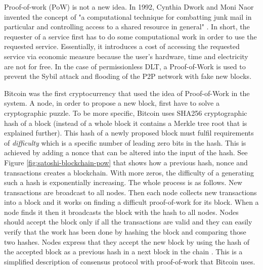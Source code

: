 Proof-of-work (PoW) is not a new idea. In 1992, Cynthia Dwork and Moni Naor invented the concept of "a computational technique for combatting junk mail in particular and controlling access to a shared resource in general" \cite{dwork_pricing_1992}.
In short, the requester of a service first has to do some computational work in order to use the requested service. Essentially, it introduces a cost of accessing the requested service via economic measure because the user's hardware, time and electricity are not for free. In the case of permissionless DLT, a Proof-of-Work is used to prevent the Sybil attack and flooding of the P2P network with fake new blocks. 

Bitcoin was the first cryptocurrency that used the idea of Proof-of-Work in the system. A node, in order to propose a new block, first have to solve a cryptographic puzzle. To be more specific, Bitcoin uses SHA256 cryptographic hash of a block (instead of a whole block it contains a Merkle tree root that is explained further). This hash of a newly proposed block must fulfil requirements of \textit{difficulty} which is a specific number of leading zero bits in the hash. This is achieved by adding a nonce that can be altered into the input of the hash. See Figure \ref{fig:satoshi-blockchain-pow} that shows how a previous hash, nonce and transactions creates a blockchain. With more zeros, the difficulty of a generating such a hash is exponentially increasing. The whole process is as follows. New transactions are broadcast to all nodes. Then each node collects new transactions into a block and it works on finding a difficult proof-of-work for its block. When a node finds it then it broadcasts the block with the hash to all nodes. Nodes should accept the block only if all the transactions are valid and they can easily verify that the work has been done by hashing the block and comparing those two hashes. Nodes express that they accept the new block by using the hash of the accepted block as a previous hash in a next block in the chain \cite{nakamoto_bitcoin:_2008}. This is a simplified description of consensus protocol with proof-of-work that Bitcoin uses.

